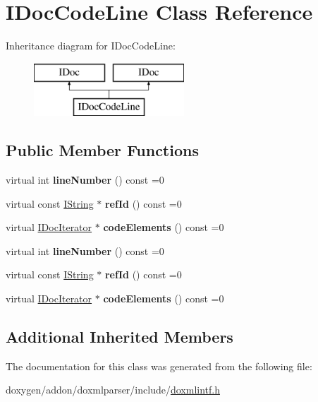 \hypertarget{class_i_doc_code_line}{}\section{I\+Doc\+Code\+Line Class Reference}
\label{class_i_doc_code_line}
Inheritance diagram for I\+Doc\+Code\+Line\+:\begin{figure}[H]
\begin{center}
\leavevmode
\includegraphics[height=2.000000cm]{class_i_doc_code_line}
\end{center}
\end{figure}
\subsection*{Public Member Functions}
\begin{DoxyCompactItemize}
\item 
\mbox{\label{class_i_doc_code_line_a01319434ed55a2eb7838c65f9e0b8c25}} 
virtual int {\bfseries line\+Number} () const =0
\item 
\mbox{\label{class_i_doc_code_line_affef0125787ce9dd95e37ccdd86dab5a}} 
virtual const \mbox{\hyperlink{class_i_string}{I\+String}} $\ast$ {\bfseries ref\+Id} () const =0
\item 
\mbox{\label{class_i_doc_code_line_a43acee7eeafc2dddbce0497aa928e865}} 
virtual \mbox{\hyperlink{class_i_doc_iterator}{I\+Doc\+Iterator}} $\ast$ {\bfseries code\+Elements} () const =0
\item 
\mbox{\label{class_i_doc_code_line_a01319434ed55a2eb7838c65f9e0b8c25}} 
virtual int {\bfseries line\+Number} () const =0
\item 
\mbox{\label{class_i_doc_code_line_affef0125787ce9dd95e37ccdd86dab5a}} 
virtual const \mbox{\hyperlink{class_i_string}{I\+String}} $\ast$ {\bfseries ref\+Id} () const =0
\item 
\mbox{\label{class_i_doc_code_line_a43acee7eeafc2dddbce0497aa928e865}} 
virtual \mbox{\hyperlink{class_i_doc_iterator}{I\+Doc\+Iterator}} $\ast$ {\bfseries code\+Elements} () const =0
\end{DoxyCompactItemize}
\subsection*{Additional Inherited Members}


The documentation for this class was generated from the following file\+:\begin{DoxyCompactItemize}
\item 
doxygen/addon/doxmlparser/include/\mbox{\hyperlink{include_2doxmlintf_8h}{doxmlintf.\+h}}\end{DoxyCompactItemize}
